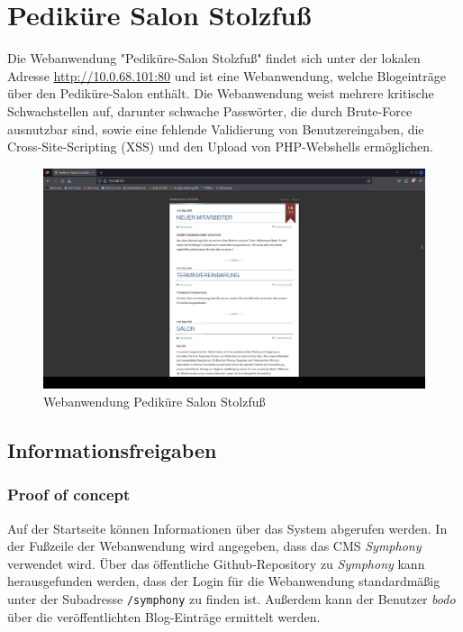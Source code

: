 \chapter{Pediküre Salon Stolzfuß}
Die Webanwendung "Pediküre-Salon Stolzfuß" findet sich unter der lokalen Adresse \url{http://10.0.68.101:80} und ist eine Webanwendung, welche Blogeinträge über den Pediküre-Salon enthält. Die Webanwendung weist mehrere kritische Schwachstellen auf, darunter schwache Passwörter, die durch Brute-Force ausnutzbar sind, sowie eine fehlende Validierung von Benutzereingaben, die Cross-Site-Scripting (XSS) und den Upload von PHP-Webshells ermöglichen.\\

\begin{figure}[!ht]
    \centering
    \includegraphics[width=\linewidth]{images/screenshots/03_pedikuere_salon.png}
    \caption{Webanwendung Pediküre Salon Stolzfuß}
    \label{fig:01_pedikuere_salon}
\end{figure}
\newpage

\section{\makecvssbadge Informationsfreigaben}
\subsection*{Proof of concept}
 Auf der Startseite können Informationen über das System abgerufen werden. In der Fußzeile der Webanwendung wird angegeben, dass das CMS \textit{Symphony} verwendet wird. Über das öffentliche Github-Repository zu \textit{Symphony} kann herausgefunden werden, dass der Login für die Webanwendung standardmäßig unter der Subadresse \texttt{/symphony} zu finden ist. Außerdem kann der Benutzer \textit{bodo} über die veröffentlichten Blog-Einträge ermittelt werden. 

